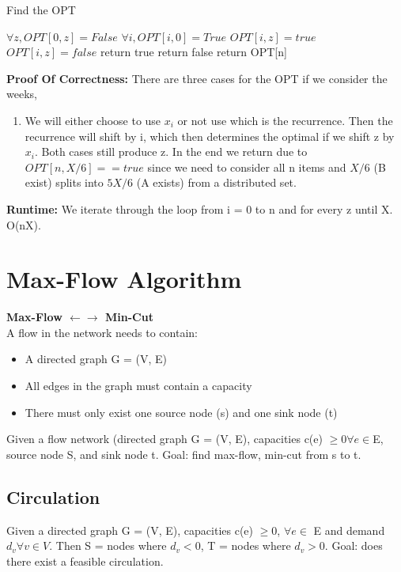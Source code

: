 \documentclass[]{article}
\begin{document}
\begin{enumerate}
    \begin{algorithm}
    \caption{Find the OPT}\label{alg:cap}
    \begin{algorithmic}    
    \State $\forall z, OPT[0, z] = False$
    \State $\forall i, OPT[i, 0] = True$
        \State $OPT[i, z] = true$
    \Else
        \State $OPT[i, z] = false$
    \EndIf
    \EndFor
    \EndFor
        \State return true
    \Else
        \State return false
    \EndIf
    \State return OPT[n]
    \end{algorithmic}
    \end{algorithm}
    \textbf{Proof Of Correctness:} There are three cases for the OPT if we consider the weeks, 
    \begin{enumerate}
        \item We will either choose to use $x_i$ or not use which is the recurrence. Then the recurrence will shift by i, which then determines the optimal if we shift z by $x_i$. Both cases still produce z. In the end we return due to $OPT[n, X/6] == true$ since we need to consider all n items and $X/6$ (B exist) splits into $5X/6$ (A exists) from a distributed set.
    \end{enumerate}
    \textbf{Runtime:} We iterate through the loop from i = 0 to n and for every z until X. O(nX).
    
\end{enumerate}

\clearpage
\section{Max-Flow Algorithm}
\textbf{Max-Flow $\leftarrow\rightarrow$ Min-Cut} \\
A flow in the network needs to contain:
\begin{itemize}
    \item A directed graph G = (V, E) 
    \item All edges in the graph must contain a capacity
    \item There must only exist one source node (s) and one sink node (t)
\end{itemize}
Given a flow network (directed graph G = (V, E), capacities c(e) $\geq 0 \forall e \in $E, source node S, and sink node t. Goal: find max-flow, min-cut from s to t.

\subsection{Circulation}
Given a directed graph G = (V, E), capacities c(e) $\geq 0$, $\forall e \in$ E and demand $d_v \forall v \in V$. Then S = nodes where $d_v < 0$, T = nodes where $d_v > 0$. Goal: does there exist a feasible circulation.
\clearpage
\end{document}
